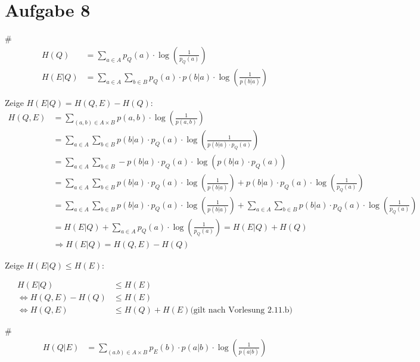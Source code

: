 \section*{Aufgabe 8}
\begin{myList}
#
\begin{align*}
	H(Q) &= \sum\limits_{a \in A} p_Q(a) \cdot \log \left( \frac{1}{p_Q(a)} \right) \\
	H(E|Q) &= \sum\limits_{a \in A} \sum\limits_{b \in B} p_Q(a) \cdot p(b|a) \cdot \log \left( \frac{1}{p(b|a)}\right) 
\end{align*}

Zeige $H(E|Q) = H(Q,E) - H(Q)$:
\begin{align*}
	H(Q,E) &= \sum\limits_{(a,b) \in A\times B} p(a,b) \cdot \log\left(\frac{1}{p(a,b)}\right) \\
	&= \sum\limits_{a \in A} \sum\limits_{b \in B} p(b|a) \cdot p_Q(a) \cdot \log \left( \frac{1}{p(b|a) \cdot p_Q(a)} \right) \\
	&= \sum\limits_{a \in A} \sum\limits_{b \in B} -p(b|a) \cdot p_Q(a) \cdot \log \left(p(b|a) \cdot p_Q(a) \right) \\
	&= \sum\limits_{a \in A} \sum\limits_{b \in B} p(b|a) \cdot p_Q(a) \cdot \log \left(\frac{1}{p(b|a)} \right) + p(b|a) \cdot p_Q(a) \cdot \log \left(\frac{1}{p_Q(a)} \right) \\
	&= \sum\limits_{a \in A} \sum\limits_{b \in B} p(b|a) \cdot p_Q(a) \cdot \log \left(\frac{1}{p(b|a)} \right) + \sum\limits_{a \in A} \sum\limits_{b \in B} p(b|a) \cdot p_Q(a) \cdot \log \left(\frac{1}{p_Q(a)} \right) \\
	&= H(E|Q) + \sum\limits_{a \in A}  p_Q(a) \cdot \log \left(\frac{1}{p_Q(a)} \right) = H(E|Q) + H(Q)\\
	&\Rightarrow H(E|Q) = H(Q,E) - H(Q)
\end{align*}

Zeige $H(E|Q) \leq H(E)$:

\begin{align*}
	 H(E|Q) &\leq H(E) \\
	\Leftrightarrow H(Q,E) - H(Q) &\leq H(E) \\
	\Leftrightarrow H(Q,E) &\leq H(Q) + H(E) \text{(gilt nach Vorlesung 2.11.b)}
\end{align*}

#
\begin{align*}
	H(Q|E) &= \sum\limits_{(a.b) \in A \times B} p_E(b)\cdot p(a|b) \cdot \log \left( \frac{1}{p(a|b)}\right)
\end{align*}


\end{myList}
